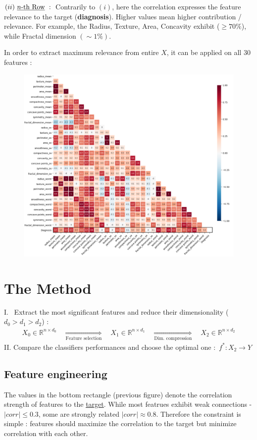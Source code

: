 \documentclass[12pt]{article}
\numberwithin{equation}{section}
\begin{document}
\begin{flushleft}
$(ii)  \ \text{\underline{$n$-th Row} } : \,$ Contrarily to $(i)$, here the correlation expresses the feature relevance to the target (\textbf{diagnosis}). Higher values mean higher contribution / relevance. For example, the Radius, Texture, Area, Concavity exhibit ($\geq 70 \% $), while Fractal dimension $(\sim 1 \%)$. 

In order to extract maximum relevance from entire $X$, it can be applied on all 30 features :
\begin{figure}[H]
\centering
\includegraphics[width=1.115\linewidth, center]{Corr_full_rect.png}
\end{figure}

\section{The Method}
I. \, Extract the most significant features and reduce their dimensionality ($d_0 > d_1 > d_2$) :
\begin{align*}  
X_0 \in \mathbb{R}^{n \times d_0} \quad \underset{\text{Feature selection}}{\Rightarrow} \quad X_1 \in \mathbb{R}^{n \times d_{1}} \quad \underset{\text{Dim. compression}}{\Rightarrow} \quad X_2 \in \mathbb{R}^{n \times d_{2}}
\end{align*}  
II. Compare the classifiers performances and choose the optimal one : $\, f^* : X_2 \rightarrow Y$

\subsection{Feature engineering}
The values in the bottom rectangle (previous figure) denote the correlation strength of features to the \underline{target}. While most featrues exhibit weak connections - $| {corr} | \leq 0.3$, some are strongly related $| {corr} | \approx 0.8$. Therefore the constraint is simple : features should maximize the correlation to the target but minimize correlation with each other. 
 

\end{flushleft}
\end{document}

